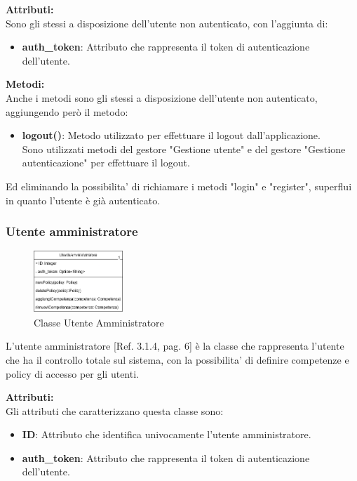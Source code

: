 \documentclass{article}
\begin{document}
\textbf{Attributi:}\\
Sono gli stessi a disposizione dell'utente non autenticato, con l'aggiunta di:
\begin{itemize}
    \item \textbf{auth\_token}: Attributo che rappresenta il token di autenticazione dell'utente.
\end{itemize}

\textbf{Metodi:}\\
Anche i metodi sono gli stessi a disposizione dell'utente non autenticato, aggiungendo però il metodo:
\begin{itemize}
    \item \textbf{logout()}: Metodo utilizzato per effettuare il logout dall'applicazione.\\Sono utilizzati metodi del gestore "Gestione utente" e del gestore "Gestione autenticazione" per effettuare il logout.
\end{itemize}
Ed eliminando la possibilita' di richiamare i metodi "login" e "register", superflui in quanto l'utente è già autenticato.

\clearpage

\subsubsection{Utente amministratore}

\begin{figure}[htbp]
    \centering
    \includegraphics[width=0.3\textwidth]{Images/utenteAmministratore_class.png}
    \caption{Classe Utente Amministratore}
    \label{fig:utente_amministratore}
\end{figure}

L'utente amministratore [Ref. 3.1.4, pag. 6] è la classe che rappresenta l'utente che ha il controllo totale sul sistema, con la possibilita' di definire competenze e policy di accesso per gli utenti.

\textbf{Attributi:}\\
Gli attributi che caratterizzano questa classe sono:
\begin{itemize}
    \item \textbf{ID}: Attributo che identifica univocamente l'utente amministratore.
    \item \textbf{auth\_token}: Attributo che rappresenta il token di autenticazione dell'utente.
\end{itemize}
\end{document}
